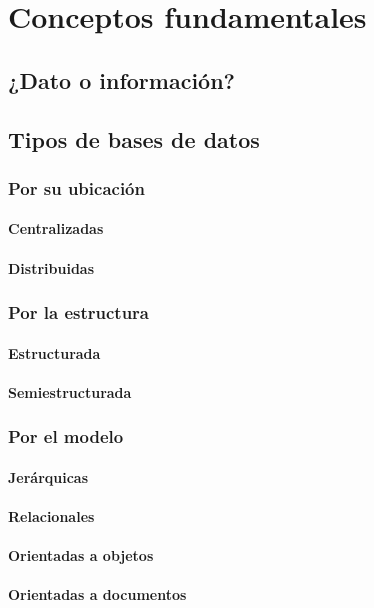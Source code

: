 \documentclass[12pt]{report}
\begin{document}
	\section{Conceptos fundamentales}
		\subsection{¿Dato o información?}
		\subsection{Tipos de bases de datos}
			\subsubsection{Por su ubicación}
				\paragraph{Centralizadas}
				\paragraph{Distribuidas}
			\subsubsection{Por la estructura}
				\paragraph{Estructurada}
				\paragraph{Semiestructurada}
			\subsubsection{Por el modelo}
				\paragraph{Jerárquicas}
				\paragraph{Relacionales}
				\paragraph{Orientadas a objetos}
				\paragraph{Orientadas a documentos}
\end{document}
